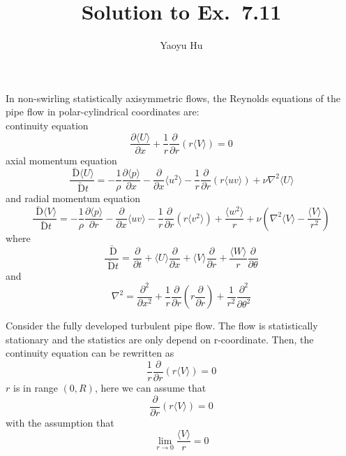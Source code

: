\documentclass{article}
\title{Solution to Ex.~7.11}
\author{Yaoyu Hu}
\newcommand{\DD}{\; \mathrm{D}}
\newcommand{\enangle}[1]{\langle {#1} \rangle}
\newcommand{\parpar}[2]{\frac{\partial {#1}}{\partial {#2}}}
\newcommand{\parpard}[2]{\frac{\partial^2 {#1}}{\partial {#2}^2}}
\begin{document}
\maketitle

In non-swirling statistically axisymmetric flows, the Reynolds equations of the pipe flow in polar-cylindrical coordinates are: \\
continuity equation
\begin{equation}
	\parpar{\enangle{U}}{x} + \frac{1}{r}\parpar{}{r}(r\enangle{V}) = 0
\end{equation}
axial momentum equation
\begin{equation} \label{eq:axial}
	\frac{\bar{\DD} \enangle{U}}{\bar{\DD} t} = - \frac{1}{\rho}\frac{\partial \enangle{p}}{\partial x} - \parpar{}{x} \enangle{u^2} - \frac{1}{r}\parpar{}{r}(r\enangle{uv}) + \nu\nabla^2\enangle{U}
\end{equation}
and radial momentum equation
\begin{equation}
	\frac{\bar{\DD} \enangle{V}}{\bar{\DD} t} = - \frac{1}{\rho}\parpar{\enangle{p}}{r} - \parpar{}{x}\enangle{uv} - \frac{1}{r}\parpar{}{r}(r\enangle{v^2}) + \frac{\enangle{w^2}}{r} + \nu\left( \nabla^2\enangle{V} - \frac{\enangle{V}}{r^2} \right)
\end{equation}
where
\begin{equation}
	\frac{\bar{\DD}}{\bar{\DD} t} = \parpar{}{t} + \enangle{U}\parpar{}{x} + \enangle{V}\parpar{}{r} + \frac{\enangle{W}}{r}\parpar{}{\theta}
\end{equation}
and
\begin{equation}
	\nabla^2 = \parpard{}{x} + \frac{1}{r}\parpar{}{r}\left( r\parpar{}{r} \right) + \frac{1}{r^2}\parpard{}{\theta}
\end{equation}

Consider the fully developed turbulent pipe flow. The flow is statistically stationary and the statistics are only depend on r-coordinate. Then, the continuity equation can be rewritten as
\begin{equation}
	\frac{1}{r}\parpar{}{r}(r\enangle{V}) = 0
\end{equation}
$r$ is in range $(0,R)$, here we can assume that
\begin{equation} \label{eq:cont}
	\parpar{}{r}(r\enangle{V}) = 0
\end{equation}
with the assumption that
\begin{equation}
	\lim_{r\rightarrow 0}\frac{\enangle{V}}{r} = 0
\end{equation}
\end{document}
